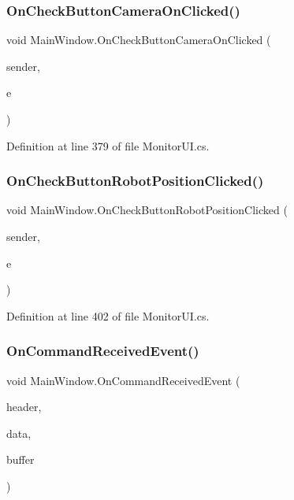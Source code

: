 \subsubsection{On\+Check\+Button\+Camera\+On\+Clicked()}
{\footnotesize\ttfamily void Main\+Window.\+On\+Check\+Button\+Camera\+On\+Clicked (\begin{DoxyParamCaption}\item[{object}]{sender,  }\item[{Event\+Args}]{e }\end{DoxyParamCaption})\hspace{0.3cm}{\ttfamily [protected]}}



Definition at line 379 of file Monitor\+U\+I.\+cs.

\mbox{\label{class_main_window_a20d07605619027d82a30552f294b128f}} 
\subsubsection{On\+Check\+Button\+Robot\+Position\+Clicked()}
{\footnotesize\ttfamily void Main\+Window.\+On\+Check\+Button\+Robot\+Position\+Clicked (\begin{DoxyParamCaption}\item[{object}]{sender,  }\item[{Event\+Args}]{e }\end{DoxyParamCaption})\hspace{0.3cm}{\ttfamily [protected]}}



Definition at line 402 of file Monitor\+U\+I.\+cs.

\mbox{\label{class_main_window_a4b651f10b9079c128b9e36d15ad10211}} 
\subsubsection{On\+Command\+Received\+Event()}
{\footnotesize\ttfamily void Main\+Window.\+On\+Command\+Received\+Event (\begin{DoxyParamCaption}\item[{string}]{header,  }\item[{string}]{data,  }\item[{byte [$\,$]}]{buffer }\end{DoxyParamCaption})}



